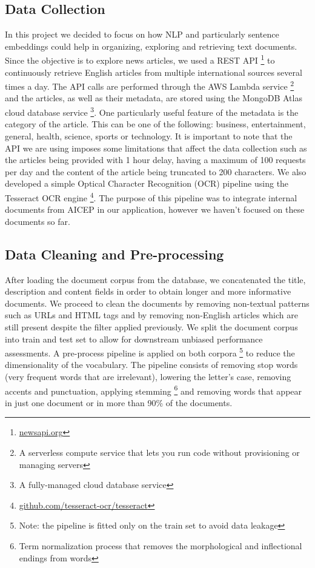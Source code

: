\documentclass[a4paper]{article}
\begin{document}
\subsection*{Data Collection}
In this project we decided to focus on how NLP and particularly sentence embeddings could help in organizing, exploring and retrieving text documents. Since the objective is to explore news articles, we used a REST API \footnote{\href{https://newsapi.org/}{newsapi.org}} to continuously retrieve English articles from multiple international sources several times a day. The API calls are performed through the AWS Lambda service \footnote{A serverless compute service that lets you run code without provisioning or managing servers} and the articles, as well as their metadata, are stored using the MongoDB Atlas cloud database service \footnote{A fully-managed cloud database service}. One particularly useful feature of the metadata is the category of the article. This can be one of the following: business, entertainment, general, health, science, sports or technology. It is important to note that the API we are using imposes some limitations that affect the data collection such as the articles being provided with 1 hour delay, having a maximum of 100 requests per day and the content of the article being truncated to 200 characters. We also developed a simple Optical Character Recognition (OCR) pipeline using the Tesseract OCR engine \footnote{\href{https://github.com/tesseract-ocr/tesseract}{github.com/tesseract-ocr/tesseract}}. The purpose of this pipeline was to integrate internal documents from AICEP in our application, however we haven't focused on these documents so far.


\subsection*{Data Cleaning and Pre-processing}
After loading the document corpus from the database, we concatenated the title, description and content fields in order to obtain longer and more informative documents. We proceed to clean the documents by removing non-textual patterns such as URLs and HTML tags and by removing non-English articles which are still present despite the filter applied previously. We split the document corpus into train and test set to allow for downstream unbiased performance assessments. A pre-process pipeline is applied on both corpora \footnote{Note: the pipeline is fitted only on the train set to avoid data leakage} to reduce the dimensionality of the vocabulary. The pipeline consists of removing stop words (very frequent words that are irrelevant), lowering the letter's case, removing accents and punctuation, applying stemming \footnote{Term normalization process that removes the morphological and inflectional endings from words} and removing words that appear in just one document or in more than 90\% of the documents.
\end{document}
